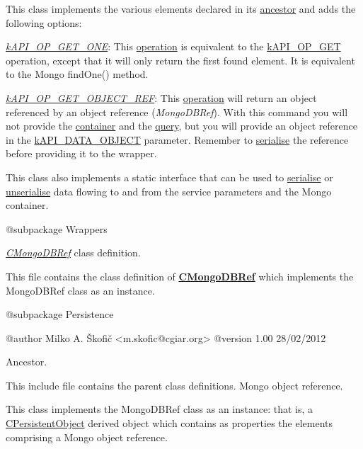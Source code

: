 This class implements the various elements declared in its \hyperlink{class_c_data_wrapper}{ancestor} and adds the following options\-:


\begin{DoxyItemize}
\item {\itshape \hyperlink{}{k\-A\-P\-I\-\_\-\-O\-P\-\_\-\-G\-E\-T\-\_\-\-O\-N\-E}\/}\-: This \hyperlink{}{operation} is equivalent to the \hyperlink{}{k\-A\-P\-I\-\_\-\-O\-P\-\_\-\-G\-E\-T} operation, except that it will only return the first found element. It is equivalent to the Mongo find\-One() method. 
\item {\itshape \hyperlink{}{k\-A\-P\-I\-\_\-\-O\-P\-\_\-\-G\-E\-T\-\_\-\-O\-B\-J\-E\-C\-T\-\_\-\-R\-E\-F}\/}\-: This \hyperlink{}{operation} will return an object referenced by an object reference ({\itshape Mongo\-D\-B\-Ref\/}). With this command you will not provide the \hyperlink{}{container} and the \hyperlink{}{query}, but you will provide an object reference in the \hyperlink{}{k\-A\-P\-I\-\_\-\-D\-A\-T\-A\-\_\-\-O\-B\-J\-E\-C\-T} parameter. Remember to \hyperlink{}{serialise} the reference before providing it to the wrapper. 
\end{DoxyItemize}

This class also implements a static interface that can be used to \hyperlink{}{serialise} or \hyperlink{}{unserialise} data flowing to and from the service parameters and the Mongo container.

\begin{DoxyVerb}    @subpackage     Wrappers\end{DoxyVerb}


{\itshape \hyperlink{class_c_mongo_d_b_ref}{C\-Mongo\-D\-B\-Ref}\/} class definition.

This file contains the class definition of {\bfseries \hyperlink{class_c_mongo_d_b_ref}{C\-Mongo\-D\-B\-Ref}} which implements the Mongo\-D\-B\-Ref class as an instance.

\begin{DoxyVerb}    @subpackage     Persistence

    @author         Milko A. Škofič <m.skofic@cgiar.org>
    @version        1.00 28/02/2012\end{DoxyVerb}


Ancestor.

This include file contains the parent class definitions. Mongo object reference.

This class implements the Mongo\-D\-B\-Ref class as an instance\-: that is, a \hyperlink{class_c_persistent_object}{C\-Persistent\-Object} derived object which contains as properties the elements comprising a Mongo object reference.

